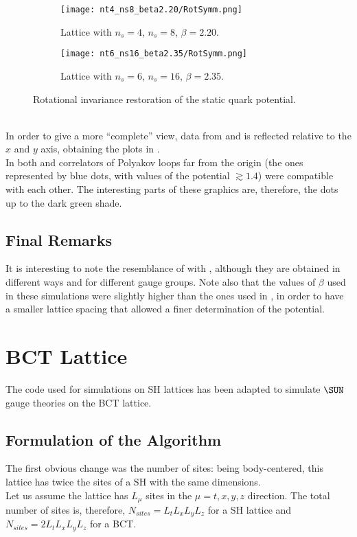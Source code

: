 \begin{figure}[!htbp]
    \centering
    \begin{subfigure}[b]{0.48\textwidth}
        \texttt{[image: nt4\_ns8\_beta2.20/RotSymm.png]}
        \caption{Lattice with $n_s=4$, $n_s=8$, $\beta=2.20$.}
        \label{4F:PotentialRestorationLargea}
    \end{subfigure}
    \begin{subfigure}[b]{0.48\textwidth}
        \texttt{[image: nt6\_ns16\_beta2.35/RotSymm.png]}
        \caption{Lattice with $n_s=6$, $n_s=16$, $\beta=2.35$.}
        \label{4F:PotentialRestorationSmalla}
    \end{subfigure}
    \caption{Rotational invariance restoration of the static quark potential.}
    \label{4F:PotentialRestoration}
\end{figure}\\
In order to give a more ``complete'' view, data from  and  is reflected relative to the $x$ and $y$ axis, obtaining the plots in .\\
In both  and  correlators of Polyakov loops far from the origin (the ones represented by blue dots, with values of the potential $\gtrsim 1.4$) were compatible with each other.
The interesting parts of these graphics are, therefore, the dots up to the dark green shade.

\subsection{Final Remarks}
It is interesting to note the resemblance of  with , although they are obtained in different ways and for different gauge groups.
Note also that the values of $\beta$ used in these simulations were slightly higher than the ones used in \cite{Lang:1982tj}, in order to have a smaller lattice spacing that allowed a finer determination of the potential.

\section{BCT Lattice}
The code used for simulations on SH lattices has been adapted to simulate $\SUN$ gauge theories on the BCT lattice.

\subsection{Formulation of the Algorithm}
The first obvious change was the number of sites: being body-centered, this lattice has twice the sites of a SH with the same dimensions.\\
Let us assume the lattice has $L_\mu$ sites in the $\mu=t,x,y,z$ direction.
The total number of sites is, therefore, $N_{sites}=L_tL_xL_yL_z$ for a SH lattice and $N_{sites}=2L_tL_xL_yL_z$ for a BCT.

